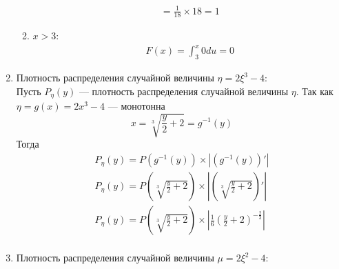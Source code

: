 \documentclass[12pt]{article}
\begin{document}
\begin{enumerate}
\begin{enumerate}
\begin{gather*}
			            = \frac{1}{18} \times 18 = 1
		            \end{gather*}
		      \item $x > 3$:
		            \begin{gather*}
			            F(x) = \int_{3}^x0du = 0
		            \end{gather*}
	      \end{enumerate}
	      \begin{center}
	      \end{center}
	\item Плотность распределения случайной величины $\eta = 2\xi^3 - 4$: \\
	      Пусть $P_{\eta}(y)$ --- плотность распределения случайной величины $\eta$.
	      Так как $\eta = g(x) = 2x^3 - 4$ --- монотонна \\
	      \[x = \sqrt[3]{\frac{y}{2} + 2} = g^{-1}(y)\]
	      Тогда
	      \begin{gather*}
		      P_{\eta}(y) = P(g^{-1}(y))\times \left|(g^{-1}(y))'\right| \\
		      P_{\eta}(y) = P\left(\sqrt[3]{\frac{y}{2} + 2}\right)\times \left|(\sqrt[3]{\frac{y}{2} + 2})'\right| \\
		      P_{\eta}(y) = P\left(\sqrt[3]{\frac{y}{2} + 2}\right)\times \left|\frac{1}{6}\left(\frac{y}{2} + 2 \right)^{-\frac{2}{3}}\right| \\
	      \end{gather*}
	\item Плотность распределения случайной величины $\mu = 2\xi^2 - 4$:
\end{enumerate}
\end{document}
